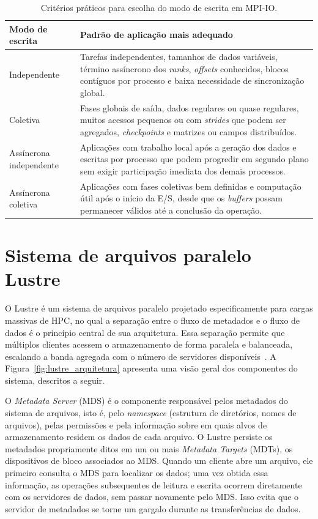 \begin{table}[H]
\centering
\caption{Critérios práticos para escolha do modo de escrita em MPI-IO.}
\label{tab:criterios_mpiio}
\begin{tabularx}{\textwidth}{p{}X}
\toprule
\textbf{Modo de escrita} & \textbf{Padrão de aplicação mais adequado} \\
\midrule
Independente &
Tarefas independentes, tamanhos de dados variáveis, término assíncrono dos
\textit{ranks}, \textit{offsets} conhecidos, blocos contíguos por processo e
baixa necessidade de sincronização global. \\
Coletiva &
Fases globais de saída, dados regulares ou quase regulares, muitos acessos
pequenos ou com \textit{strides} que podem ser agregados,
\textit{checkpoints} e matrizes ou campos distribuídos. \\
Assíncrona independente &
Aplicações com trabalho local após a geração dos dados e escritas por
processo que podem progredir em segundo plano sem exigir participação
imediata dos demais processos. \\
Assíncrona coletiva &
Aplicações com fases coletivas bem definidas e computação útil após o início
da E/S, desde que os \textit{buffers} possam permanecer válidos até a
conclusão da operação. \\
\bottomrule
\end{tabularx}
\end{table}

\section{Sistema de arquivos paralelo Lustre}
\label{sec:lustre}
O Lustre é um sistema de arquivos paralelo projetado especificamente para
cargas massivas de HPC, no qual a separação entre o fluxo de metadados e o
fluxo de dados é o princípio central de sua arquitetura. Essa separação
permite que múltiplos clientes acessem o armazenamento de forma paralela e
balanceada, escalando a banda agregada com o número de servidores
disponíveis~\cite{Pjb:02,LustreManual}. A
Figura~\ref{fig:lustre_arquitetura} apresenta uma visão geral dos
componentes do sistema, descritos a seguir.

O \textit{Metadata Server} (MDS) é o componente responsável pelos
metadados do sistema de arquivos, isto é, pelo \textit{namespace} (estrutura
de diretórios, nomes de arquivos), pelas permissões e pela informação sobre
em quais alvos de armazenamento residem os dados de cada arquivo. O
Lustre persiste os metadados propriamente ditos em um ou mais
\textit{Metadata Targets} (MDTs), os dispositivos de bloco associados ao
MDS. Quando um cliente abre um arquivo, ele primeiro consulta o MDS para
localizar os dados; uma vez obtida essa informação, as operações
subsequentes de leitura e escrita ocorrem diretamente com os servidores de
dados, sem passar novamente pelo MDS. Isso evita que o servidor de
metadados se torne um gargalo durante as transferências de dados.

